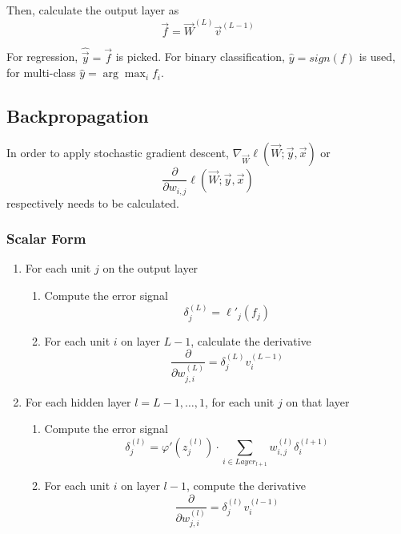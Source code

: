 Then, calculate the output layer as
\begin{equation*}
\vec{f} = \vec{W}^{(L)} \vec{v}^{(L-1)}
\end{equation*}

For regression, $\hat{\vec{y}} = \vec{f}$ is picked.
For binary classification, $\hat{y} = sign(f)$ is used,
for multi-class $\hat{y} = \arg\max_i{f_i}$.


\subsection{Backpropagation}
In order to apply stochastic gradient descent,
$\nabla_{\vec{W}} \ell(\vec{W}; \vec{y}, \vec{x})$
or
\begin{equation*}
\frac{\partial}{\partial w_{i,j}}
\ell(\vec{W}; \vec{y}, \vec{x})
\end{equation*}
respectively needs to be calculated.

\subsubsection{Scalar Form}
\begin{enumerate}
	\item For each unit $j$ on the output layer
	\begin{enumerate}
		\item Compute the error signal
		\begin{equation*}
		\delta_j^{(L)} = \ell'_j(f_j)
		\end{equation*}
		\item For each unit $i$ on layer $L - 1$,
		calculate the derivative
		\begin{equation*}
		\frac{\partial}{\partial w_{j,i}^{(L)}} = \delta_j^{(L)} v_i^{(L - 1)}
		\end{equation*}
	\end{enumerate}
	
	\item For each hidden layer $l = L - 1, \dotsc, 1$,
	for each unit $j$ on that layer
	\begin{enumerate}
		\item Compute the error signal
		\begin{equation*}
		\delta_j^{(l)} = \varphi'(z_j^{(l)}) \cdot
		\sum_{i \in Layer_{l+1}}{w_{i,j}^{(l)} \delta_i^{(l+1)}}
		\end{equation*}
		\item For each unit $i$ on layer $l - 1$,
		compute the derivative
		\begin{equation*}
		\frac{\partial}{\partial w_{j,i}^{(l)}} = \delta_j^{(l)} v_i^{(l-1)}
		\end{equation*}
	\end{enumerate}
\end{enumerate}

